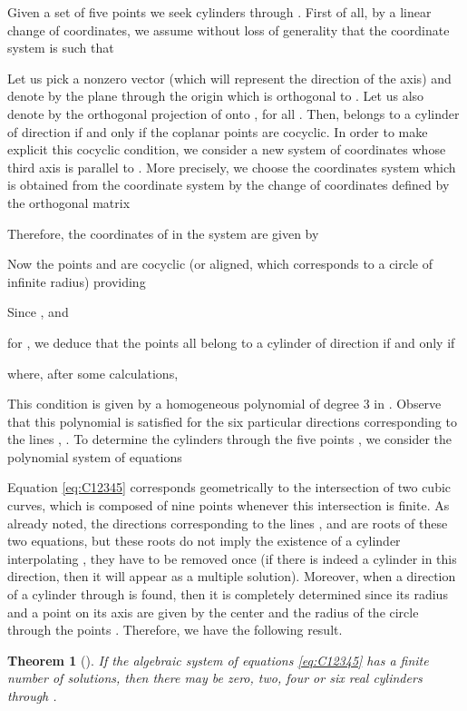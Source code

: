 \documentclass[5p]{elsarticle}
\newtheorem{thm}{Theorem}
\newcommand{\com}[1]{{\color{black} #1}}
\newcommand{\lb}[1]{{\color{black} #1}}
\begin{document}
\lb{Given} a set  of five points  \lb{we seek cylinders} through . First of all, \lb{by a linear} change of coordinates, we assume without loss of generality that the coordinate system  is such that
 


Let us pick a nonzero vector  (which will represent the direction of the axis) and denote by  the plane through the origin which is orthogonal to . Let us also denote by  the orthogonal projection of  onto , for all . Then,  belongs to a cylinder of direction  if and only if the coplanar points  are cocyclic. In order to make explicit \lb{this cocyclic condition}, we consider a new system of coordinates  whose third axis is parallel to . More precisely, we choose the coordinates system  which is obtained from the coordinate system  by the change of coordinates defined by the orthogonal matrix

Therefore, the coordinates of  in the system  are given by

\com{Now} the points  and  are cocyclic (or aligned, which corresponds to a circle of infinite radius) providing 

Since ,  and

for , we deduce that the points  all belong to a cylinder  
of direction  if and only if 
 
where, after some \com{calculations},

This condition is given by a homogeneous polynomial of degree 3 in . Observe that \com{this polynomial} is satisfied for the six particular directions corresponding to the lines , . To determine the cylinders through the five points 
, we consider the polynomial system of equations

\com{Equation \ref{eq:C12345}} corresponds geometrically to the intersection of two cubic curves, which is composed of nine points whenever this intersection is finite. As already \com{noted}, the directions corresponding to the lines ,  and  are roots of these two equations, but \com{these roots} do not imply the existence of a cylinder interpolating , they have to be removed once (if there is indeed a cylinder in this direction, then it will appear as a multiple solution). Moreover, when a direction of a cylinder through  is found, then it is completely determined since its radius and a point on its axis are given by the center and the radius of the circle through the points . Therefore, we have the following result.

\begin{thm}[\cite{Devillers02}] If the algebraic system of equations \eqref{eq:C12345} has a finite number of solutions, then there may be zero, two, four or six real cylinders through .	
\end{thm} 
\end{document}
